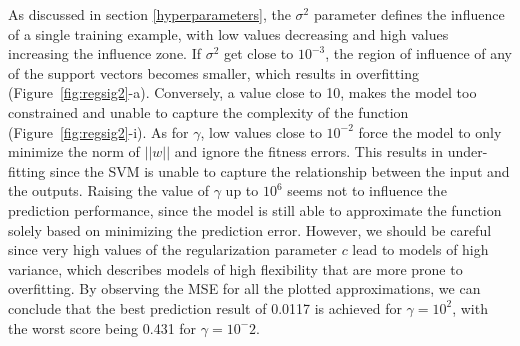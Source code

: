 \documentclass[conference,compsoc]{IEEEtran}
\begin{document}
As discussed in section \ref{hyperparameters}, the $\sigma^2$ parameter defines the influence of a single training example, with low values decreasing and high values increasing the influence zone. If $\sigma^2$ get close to $10^{-3}$, the region of influence of any of the support vectors becomes smaller, which results in overfitting (Figure~\ref{fig:regsig2}-a). Conversely, a value close to 10, makes the model too constrained and unable to capture the complexity of the function (Figure~\ref{fig:regsig2}-i). As for $\gamma$, low values close to $10^{-2}$ force the model to only minimize the norm of $||w||$ and ignore the fitness errors. This results in under-fitting since the SVM is unable to capture the relationship between the input and the outputs. Raising the value of $\gamma$ up to $10^6$ seems not to influence the prediction performance, since the model is still able to approximate the function solely based on minimizing the prediction error. However, we should be careful since very high values of the regularization parameter $c$ lead to models of high variance, which describes models of high flexibility that are more prone to overfitting. By observing the MSE for all the plotted approximations, we can  conclude that the best prediction result of 0.0117 is achieved for $\gamma=10^2$, with the worst score being 0.431 for $\gamma=10^-2.$
\end{document}
